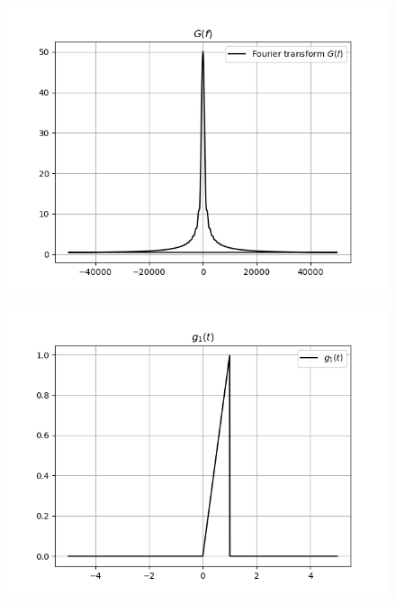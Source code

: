 \documentclass[journal,12pt,twocolumn]{IEEEtran}
\begin{document}
\begin{figure}[!ht]
\centering
 \includegraphics[width=\columnwidth]{graphs/fourier_g.png}
\end{figure}
    
\begin{figure}[!ht]
\centering
 \includegraphics[width=\columnwidth]{graphs/g1.png}
\end{figure}
\end{document}
